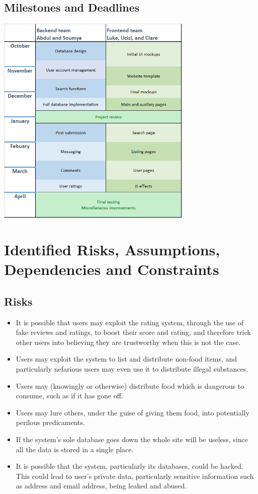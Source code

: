 \documentclass[12pt]{article}
\begin{document}
\subsection{Milestones and Deadlines}
\includegraphics[width=0.7\textwidth]{images/plan.png}
\pagebreak

\section{Identified Risks, Assumptions, Dependencies and Constraints}
\subsection{Risks}
\begin{itemize}

    \item It is possible that users may exploit the rating system, through the use of fake reviews and ratings, to boost their score and rating, and therefore trick other users into believing they are trustworthy when this is not the case.

    \item Users may exploit the system to list and distribute non-food items, and particularly nefarious users may even use it to distribute illegal substances.
    
    \item Users may (knowingly or otherwise) distribute food which is dangerous to consume, such as if it has gone off.
    
    \item Users may lure others, under the guise of giving them food, into potentially perilous predicaments.
    
    \item If the system’s sole database goes down the whole site will be useless, since all the data is stored in a single place.
    
    \item It is possible that the system, particularly its databases, could be hacked. This could lead to user’s private data, particularly sensitive information such as address and email address, being leaked and abused.
    
    \end{itemize}
\end{document}
